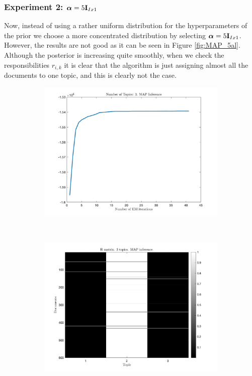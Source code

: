 \documentclass[12pt]{article}
\begin{document}
\subsubsection{Experiment 2: $\boldsymbol\alpha = 5\mathbf{I}_{Ix1}$}

Now, instead of using a rather uniform distribution for the hyperparameters of the prior we choose a more concentrated distribution by selecting  $\boldsymbol\alpha = 5\mathbf{I}_{Ix1}$. However, the results are not good as it can be seen in Figure \ref{fig:MAP_5al}. Although the posterior is increasing quite smoothly, when we check the responsibilities $r_{i,k}$ it is clear that the algorithm is just assigning almost all the documents to one topic, and this is clearly not the case. 


\begin{figure}[h!]
	\centering
	\begin{subfigure}{0.4\textwidth}
		\includegraphics[width=\textwidth]{images/MAP/Q_map_3_topics_alpha5.jpg}
		\caption{}
		\label{fig:Q_MAP_5al}
	\end{subfigure}
	~	
	\begin{subfigure}{0.4\textwidth}
		\includegraphics[width=\textwidth]{images/MAP/R_map_3_topics_alpha5.jpg}

\end{subfigure}
\end{figure}
\end{document}
